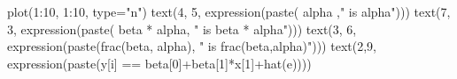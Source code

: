 \begin{Schunk}
\begin{Sinput}
 plot(1:10, 1:10, type="n")
 text(4, 5, expression(paste( alpha  ," is alpha")))
 text(7, 3, expression(paste( beta * alpha, " is beta * alpha")))
 text(3, 6, expression(paste(frac(beta, alpha), " is frac(beta,alpha)")))
 text(2,9, expression(paste(y[i] == beta[0]+beta[1]*x[1]+hat(e))))
\end{Sinput}
\end{Schunk}
